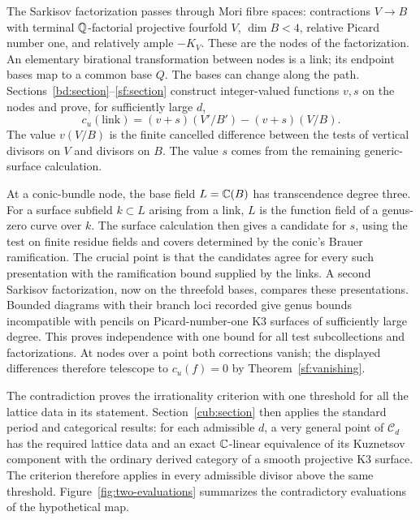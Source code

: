 The Sarkisov factorization passes through Mori fibre spaces: contractions
\(V\to B\) with terminal \(\mathbb Q\)-factorial projective fourfold \(V\),
\(\dim B<4\), relative Picard number one, and relatively ample
\(-K_V\). These are the nodes of the factorization. An elementary
birational transformation between nodes is a link; its endpoint bases
map to a common base \(Q\). The bases can change along the path.
Sections~\ref{bd:section}--\ref{sf:section} construct integer-valued
functions \(v,s\) on the nodes and prove, for sufficiently large \(d\),
\[
 c_u(\text{link})=(v+s)(V'/B')-(v+s)(V/B).
\]
The value \(v(V/B)\) is the finite cancelled difference between the
tests of vertical divisors on \(V\) and divisors on \(B\).
The value \(s\) comes from the remaining generic-surface calculation.

At a conic-bundle node, the base field \(L=\mathbb C(B)\) has transcendence
degree three. For a surface subfield \(k\subset L\) arising from a link,
\(L\) is the function field of a genus-zero curve over \(k\). The surface
calculation
then gives a candidate for \(s\), using the test on finite residue
fields and covers determined by the conic's Brauer ramification.
The crucial point is that the candidates agree for every such
presentation with the ramification bound supplied by the links.
A second Sarkisov factorization, now on the threefold bases, compares
these presentations. Bounded diagrams with their branch loci recorded
give genus bounds incompatible with pencils on Picard-number-one K3
surfaces of sufficiently large degree. This proves independence with
one bound for all test subcollections and factorizations. At nodes over
a point both corrections vanish; the displayed differences therefore
telescope to \(c_u(f)=0\) by Theorem~\ref{sf:vanishing}.

The contradiction proves the irrationality criterion with one threshold
for all the lattice data in its statement. Section~\ref{cub:section} then
applies the standard period and categorical results: for each admissible
\(d\), a very general point of \(\mathcal C_d\) has the required lattice
data and an exact \(\mathbb C\)-linear equivalence of its Kuznetsov component
with the ordinary derived category of a smooth projective K3 surface.
The criterion therefore applies in every admissible divisor above the
same threshold. Figure~\ref{fig:two-evaluations} summarizes the
contradictory evaluations of the hypothetical map.

